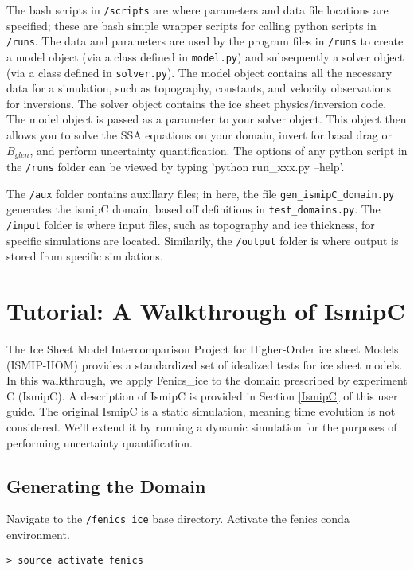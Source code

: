 \documentclass[11pt, reqno, nocenter]{article}
\begin{document}
The bash scripts in {\tt /scripts} are where parameters and data file locations are specified; these are bash simple wrapper scripts for calling python scripts in {\tt /runs}. The data and parameters are used by the program files in {\tt /runs} to create a model object (via a class defined in {\tt model.py}) and subsequently a solver object (via a class defined in {\tt solver.py}). The model object contains all the necessary data for a simulation, such as topography, constants, and velocity observations for inversions. The solver object contains the ice sheet physics/inversion code. The model object is passed as a parameter to your solver object. This object then allows you to solve the SSA equations on your domain, invert for basal drag or $B_{glen}$, and perform uncertainty quantification. The options of any python script in the {\tt /runs} folder can be viewed by typing 'python run\_xxx.py --help'.


The {\tt /aux} folder contains auxillary files; in here, the file {\tt gen\_ismipC\_domain.py} generates the ismipC domain,  based off definitions in {\tt test\_domains.py}. The {\tt /input} folder is where input files, such as topography and ice thickness, for specific simulations are located. Similarily, the {\tt /output} folder is where output is stored from specific simulations.

\section{Tutorial: A Walkthrough of IsmipC}

The Ice Sheet Model Intercomparison Project for Higher-Order ice sheet Models (ISMIP-HOM) provides a standardized set of idealized tests for ice sheet models. In this walkthrough, we apply Fenics\_ice to the domain prescribed by experiment C (IsmipC). A description of IsmipC is provided in Section \ref{IsmipC} of this user guide. The original IsmipC is a static simulation, meaning time evolution is not considered. We'll extend it by running a dynamic simulation for the purposes of performing uncertainty quantification.


\subsection{Generating the Domain}

Navigate to the {\tt /fenics\_ice} base directory. Activate the fenics conda environment.

\begin{verbatim}
> source activate fenics 
\end{verbatim}
\end{document}

